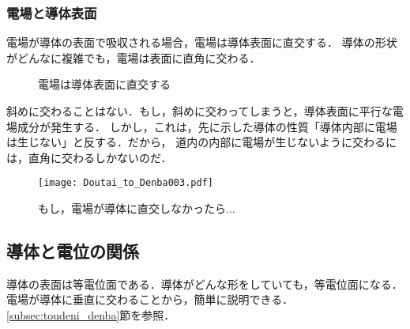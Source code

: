         \subsubsection{電場と導体表面}
        電場が導体の表面で吸収される場合，電場は導体表面に直交する．
        導体の形状がどんなに複雑でも，電場は表面に直角に交わる．
                \begin{figure}[hbt]
                    \begin{center}
                        \caption{電場は導体表面に直交する}
                        \label{fig:Doutai_to_Denba002}
                    \end{center}
                \end{figure}

        斜めに交わることはない．もし，斜めに交わってしまうと，導体表面に平行な電場成分が発生する．
        しかし，これは，先に示した導体の性質「導体内部に電場は生じない」と反する．だから，
        道内の内部に電場が生じないように交わるには，直角に交わるしかないのだ．
                \begin{figure}[hbt]
                    \begin{center}
                        \texttt{[image: Doutai\_to\_Denba003.pdf]}
                        \caption{もし，電場が導体に直交しなかったら...}
                        \label{fig:Doutai_to_Denba003}
                    \end{center}
                \end{figure}

    \subsection{導体と電位の関係}
    導体の表面は等電位面である．導体がどんな形をしていても，等電位面になる．
    電場が導体に垂直に交わることから，簡単に説明できる．
    \ref{subsec:toudeni_denba}節を参照．


